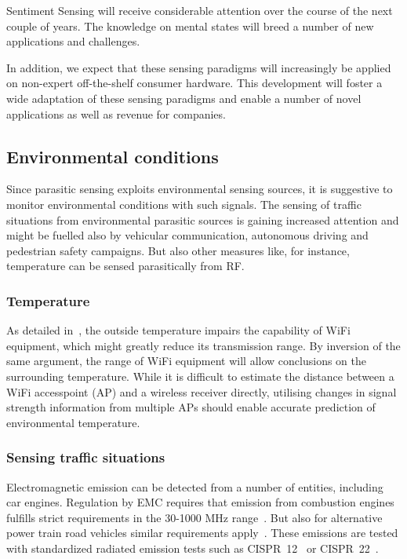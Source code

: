 \documentclass[journal]{IEEEtran}
\begin{document}
\begin{figure*}
Sentiment Sensing will receive considerable attention over the course of the next couple of years.
The knowledge on mental states will breed a number of new applications and challenges.

In addition, we expect that these sensing paradigms will increasingly be applied on non-expert off-the-shelf consumer hardware.
This development will foster a wide adaptation of these sensing paradigms and enable a number of novel applications as well as revenue for companies. 

\subsection{Environmental conditions}
Since parasitic sensing exploits environmental sensing sources, it is suggestive to monitor environmental conditions with such signals.
The sensing of traffic situations from environmental parasitic sources is gaining increased attention and might be fuelled also by vehicular communication, autonomous driving and pedestrian safety campaigns. 
But also other measures like, for instance, temperature can be sensed parasitically from RF. 

\subsubsection{Temperature}
As detailed in~\cite{Pervasive_Boano_2014}, the outside temperature impairs the capability of WiFi equipment, which might greatly reduce its transmission range.
By inversion of the same argument, the range of WiFi equipment will allow conclusions on the surrounding temperature.
While it is difficult to estimate the distance between a WiFi accesspoint (AP) and a wireless receiver directly, utilising changes in signal strength information from multiple APs should enable accurate prediction of environmental temperature.

\subsubsection{Sensing traffic situations}
Electromagnetic emission can be detected from a number of entities, including car engines. 
Regulation by EMC requires that emission from combustion engines fulfills strict requirements in the 30-1000 MHz range~\cite{RFSensing_Ruddle_2003}. 
But also for alternative power train road vehicles similar requirements apply~\cite{RFSensing_Ruddle_2003}.
These emissions are tested with standardized radiated emission tests such as CISPR~12~\cite{RFSensing_CISPR12_1997} or CISPR~22~\cite{RFSensing_CISPR22_1999}.


\end{figure*}
\end{document}
